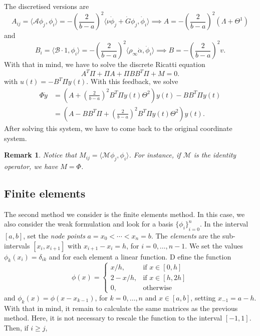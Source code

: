 \documentclass[12pt]{article}
\newcommand{\A}{\mathcal{A}}
\newcommand{\B}{\mathcal{B}}
\newcommand{\steady}{\rho_{\infty}}
\newcommand{\inner}[2]{\langle{} #1, #2 \rangle{}}
\newtheorem{remark}{Remark}[subsection]
\theoremstyle{definition}
\begin{document}
The discretised versions are 
\[
A_{ij} = \inner{\A \phi_j}{\phi_i} = -{\left(\frac{2}{b-a}\right)}^2\inner{\nu \dot \phi_j + \dot G \phi_j}{\dot \phi_i} \implies A = -{\left(\frac{2}{b-a}\right)}^2(\Lambda + \Theta^1)
\]
and 
\[
B_{i} = \inner{\B\cdot 1}{\phi_i} = -{\left(\frac{2}{b-a}\right)}^2\inner{\steady \dot\alpha}{\dot\phi_i} \implies B = -{\left(\frac{2}{b-a}\right)}^2 v.
\]
With that in mind, we have to solve the discrete Ricatti equation
\[
A^T\Pi + \Pi A + \Pi B B^T \Pi + M = 0.
\]
with $u(t) = -B^T\Pi y(t)$. 
With this feedback, we solve
\[
\begin{split}
    \Phi \dot{y} &= \left(A + {\left(\frac{2}{b-a}\right)}^2 B^T\Pi y(t) \Theta^2 \right)y(t) - BB^T\Pi y(t) \\ 
    &= \left(A - BB^T\Pi  + {\left(\frac{2}{b-a}\right)}^2 B^T\Pi y(t) \Theta^2 \right)y(t).
\end{split}
\]
After solving this system, we have to come back to the original coordinate system.

\begin{remark}
    Notice that $M_{ij} = \inner{\mathcal{M} \phi_j}{\phi_i}$.
    For instance, if $\mathcal{M}$ is the identity operator, we have $M = \Phi$.
\end{remark}

\subsection{Finite elements}

The second method we consider is the finite elements method. 
In this case, we also consider the weak formulation and look for a basis ${\{\phi_i\}}_{i=0}^{n}$.
In the interval $[a,b]$, set the {\em node points\/} $a = x_0 < \cdots < x_n = b$.
The {\em elements\/} are the sub-intervals $[x_i, x_{i+1}]$ with $x_{i+1}-x_i=h$, for $i=0, \dots, n-1$.
We set the values $\phi_k(x_i) = \delta_{ik}$ and for each element a linear function. 
D
efine the function
\[
\phi(x) = \begin{cases}
    x/h, &\text{if } x \in[0,h] \\
    2 - x/h, &\text{if } x \in [h,2h] \\
    0, &\text{otherwise}
\end{cases} 
\]
and $\phi_{k}(x) = \phi(x-x_{k-1})$, for $k=0, \dots, n$ and $x \in [a,b]$, setting $x_{-1} = a-h$.
With that in mind, it remain to calculate the same matrices as the previous method.
Here, it is not necessary to rescale the function to the interval $[-1,1]$.
Then, if $i \ge j$,
\end{document}
